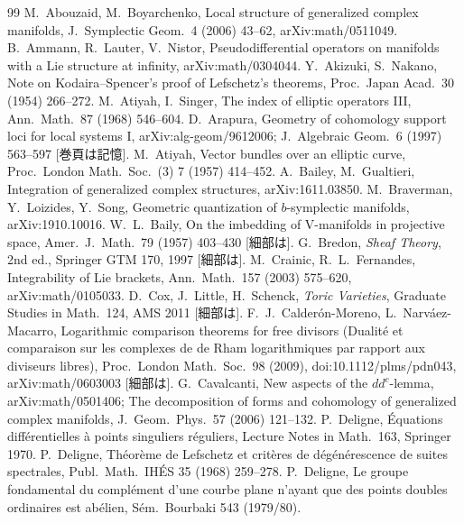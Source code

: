 \begin{thebibliography}{99}\small
{} M.\ Abouzaid, M.\ Boyarchenko, Local structure of generalized complex manifolds, J.\ Symplectic Geom.\ 4 (2006) 43--62, arXiv:math/0511049.
 B.\ Ammann, R.\ Lauter, V.\ Nistor, Pseudodifferential operators on manifolds with a Lie structure at infinity, arXiv:math/0304044.
 Y.\ Akizuki, S.\ Nakano, Note on Kodaira--Spencer's proof of Lefschetz's theorems, Proc.\ Japan Acad.\ 30 (1954) 266--272.
 M.\ Atiyah, I.\ Singer, The index of elliptic operators III, Ann.\ Math.\ 87 (1968) 546--604.
 D.\ Arapura, Geometry of cohomology support loci for local systems I, arXiv:alg-geom/9612006; J.\ Algebraic Geom.\ 6 (1997) 563--597 [巻頁は記憶\tQ].
 M.\ Atiyah, Vector bundles over an elliptic curve, Proc.\ London Math.\ Soc.\ (3) 7 (1957) 414--452.
 A.\ Bailey, M.\ Gualtieri, Integration of generalized complex structures, arXiv:1611.03850.
 M.\ Braverman, Y.\ Loizides, Y.\ Song, Geometric quantization of $b$-symplectic manifolds, arXiv:1910.10016.
 W.\ L.\ Baily, On the imbedding of V-manifolds in projective space, Amer.\ J.\ Math.\ 79 (1957) 403--430 [細部は\tQ].
 G.\ Bredon, \emph{Sheaf Theory}, 2nd ed., Springer GTM 170, 1997 [細部は\tQ].
 M.\ Crainic, R.\ L.\ Fernandes, Integrability of Lie brackets, Ann.\ Math.\ 157 (2003) 575--620, arXiv:math/0105033.
 D.\ Cox, J.\ Little, H.\ Schenck, \emph{Toric Varieties}, Graduate Studies in Math.\ 124, AMS 2011 [細部は\tQ].
 F.\ J.\ Calder\'on-Moreno, L.\ Narv\'aez-Macarro, Logarithmic comparison theorems for free divisors (Dualit\'e et comparaison sur les complexes de de Rham logarithmiques par rapport aux diviseurs libres), Proc.\ London Math.\ Soc.\ 98 (2009), doi:10.1112/plms/pdn043, arXiv:math/0603003 [細部は\tQ].
 G.\ Cavalcanti, New aspects of the $dd^c$-lemma, arXiv:math/0501406; The decomposition of forms and cohomology of generalized complex manifolds, J.\ Geom.\ Phys.\ 57 (2006) 121--132.
 P.\ Deligne, \'Equations diff\'erentielles \`a points singuliers r\'eguliers, Lecture Notes in Math.\ 163, Springer 1970.
 P.\ Deligne, Th\'eor\`eme de Lefschetz et crit\`eres de d\'eg\'en\'erescence de suites spectrales, Publ.\ Math.\ IH\'ES 35 (1968) 259--278.
 P.\ Deligne, Le groupe fondamental du compl\'ement d'une courbe plane n'ayant que des points doubles ordinaires est ab\'elien, S\'em.\ Bourbaki 543 (1979/80).

\end{thebibliography}
